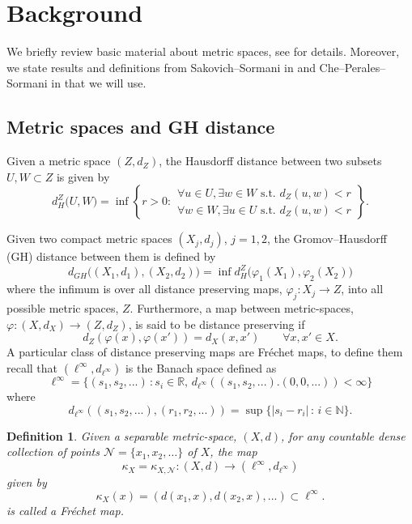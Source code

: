 \documentclass[a4paper,12pt,reqno]{amsart}
\theoremstyle{plain}
\newtheorem{defn}[thm]{Definition}
\newcommand{\be}{\begin{equation}}
\newcommand{\ee}{\end{equation}}
\begin{document}
\section{Background}\label{sec:Background-on-metric}

We briefly review 
basic material about metric spaces, see \cite{BBI} for details. Moreover, we state 
results and definitions from Sakovich--Sormani in \cite{SakSor-Notions} and Che--Perales--Sormani in
\cite{Che-Perales-Sormani-2025} that we will use. 


\subsection{Metric spaces and GH distance}


Given a metric space $(Z,d_Z)$, the Hausdorff distance between two subsets $U,W\subset Z$
is given by
\[
d_H^Z\bigg(U,W\bigg)=\inf
\left\{ r>0:  
\begin{array}{c} \forall u\in U, \exists w\in W 
\textrm{ s.t. }
d_Z(u,w)<r\\
\forall w\in W, \exists u\in U
\textrm{ s.t. }
d_Z(u,w)<r
\end{array}
\right\}.
\]


Given two compact metric spaces $(X_j,d_j)$, $j=1,2$, 
the Gromov--Hausdorff (GH) distance between them is
defined by
\[
d_{GH}\bigg((X_1,d_1),(X_2,d_2)\bigg)=\inf d_H^Z\bigg(\varphi_1(X_1),\varphi_2(X_2)\bigg)
\]
where the infimum is over all
 distance preserving maps,
$\varphi_j:X_j\to Z$, into all possible metric spaces, $Z$. 
Furthermore, a map between metric-spaces, 
$\varphi:(X,d_X)\to (Z,d_Z)$, is said to be
distance preserving if
\[
d_Z(\varphi(x),\varphi(x'))=d_X(x,x') \qquad \forall x,x'\in X.
\]
A particular class of distance preserving maps
are Fr\'echet maps, to define them recall that $(\ell^\infty, d_{\ell^\infty})$
is the Banach space defined as 
\be\label{eq:defn-ell-infty}
\ell^\infty=\{(s_1,s_2,...)\,: s_i \in {\mathbb{R}}, \, d_{\ell^\infty}((s_1,s_2,...).(0,0,...))<\infty\}
\ee
where   
\be\label{eq:d-ell-infty}
d_{\ell^\infty}((s_1,s_2,...),(r_1,r_2,...))
=\sup\{|s_i-r_i|\,:\, i\in {\mathbb N}\}.
\ee


\begin{defn}\label{defn:Frechet}
Given a separable metric-space, $(X,d)$, 
for any countable dense collection of points $\mathcal{N}=\{x_1,x_2,\ldots\}$ of $X$, 
the map
\[
\kappa_X=\kappa_{X,\mathcal{N}}: (X,d)\to (\ell^\infty, d_{\ell^\infty})
\]
given by
\be\label{eq:Frechet}
\kappa_X(x)=(d(x_1,x),d(x_2,x),...)\subset \ell^\infty.
\ee
is called a Fr\'echet map. 
\end{defn}
\end{document}
